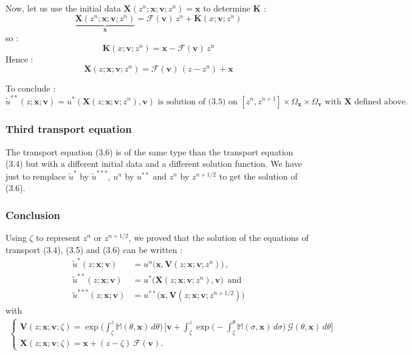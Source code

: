 \documentclass[10pt]{article}
\begin{document}
Now, let us use the initial data $\mathbf{X}(z^n;\mathbf{x;v};z^n) = \mathbf{x}$ to determine $\mathbf{K}$ : \\
$$\underbrace{\mathbf{X}(z^n;\mathbf{x;v};z^n)}_{\mathbf{x}} = \bm{\mathcal{F}}(\mathbf{v})\,z^n + \mathbf{K}(x;\mathbf{v};z^n)$$
so :
$$\mathbf{K}(x;\mathbf{v};z^n) = \mathbf{x} - \bm{\mathcal{F}}(\mathbf{v})\,z^n $$
Hence : 
$$\boxed{\mathbf{X}(z;\mathbf{x;v};z^n) = \bm{\mathcal{F}}(\mathbf{v})\,\left(z - z^n\right) + \mathbf{x}}$$

To conclude :
$$\boxed{\tilde{u}^{**}(z;\mathbf{x;v}) = u^*\left(\mathbf{X}(z;\mathbf{x;v};z^n),\mathbf{v}\right) \mbox{ is solution of (3.5) on } \left[z^n,z^{n+1}\right]\times\Omega_{\mathbf{x}}\times\Omega_{\mathbf{v}} \mbox{ with } \mathbf{X} \mbox{ defined above. } }$$


\subsubsection{Third transport equation}


The transport equation (3.6) is of the same type than the transport equation (3.4) but with a different initial data and a different solution function. We have just to remplace $\tilde{u}^{*}$ by $\tilde{u}^{***}$, $u^n$ by $u^{**}$ and $z^n$ by $z^{n+1/2}$ to get the solution of (3.6).


\subsubsection{Conclusion}


Using $\zeta$ to represent $z^n$ or $z^{n+1/2}$, we proved that the solution of the equations of transport (3.4), (3.5) and (3.6) can be written :
\begin{align*}
\tilde{u}^{*}(z;\mathbf{x};\mathbf{v}) &= u^{n}\big(\mathbf{x},\mathbf{V}(z;\mathbf{x};\mathbf{v};z^{n})\big) \, , \\
\tilde{u}^{**}(z;\mathbf{x};\mathbf{v}) &= u^{*}\big(\mathbf{X}(z;\mathbf{x};\mathbf{v};z^{n}),\mathbf{v}\big)\,\mbox{ and} \\
\tilde{u}^{***}(z;\mathbf{x};\mathbf{v}) &= u^{**}\big(\mathbf{x},\mathbf{V}(z;\mathbf{x};\mathbf{v};z^{n+1/2})\big)
\end{align*}
with
\begin{align*}
\left\lbrace \begin{array}{l}
\mathbf{V}(z;\mathbf{x};\mathbf{v};\zeta) = \exp\Big( \int_{\zeta}^{z}\mathbb{M}(\theta,\mathbf{x})\,d\theta \Big)\, \Bigg[ \mathbf{v} + \int_{\zeta}^{z} \exp\Big(-\int_{\zeta}^{\theta} \mathbb{M}(\sigma,\mathbf{x})\,d\sigma \Big) \, \bm{\mathcal{G}}(\theta,\mathbf{x}) \, d\theta \Bigg] \\
\mathbf{X}(z;\mathbf{x};\mathbf{v};\zeta) = \mathbf{x} + (z-\zeta)\,\bm{\mathcal{F}}(\mathbf{v}).
\end{array}
\right.
\end{align*}
\end{document}
